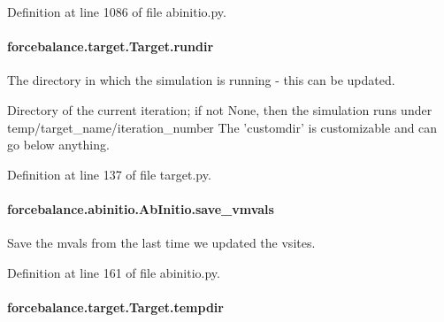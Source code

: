 Definition at line 1086 of file abinitio.\-py.

\hypertarget{classforcebalance_1_1target_1_1Target_a6872de5b2d4273b82336ea5b0da29c9e}{
\paragraph[{rundir}]{\setlength{\rightskip}{0pt plus 5cm}forcebalance.\-target.\-Target.\-rundir\hspace{0.3cm}{\ttfamily [inherited]}}}\label{classforcebalance_1_1target_1_1Target_a6872de5b2d4273b82336ea5b0da29c9e}


The directory in which the simulation is running -\/ this can be updated. 

Directory of the current iteration; if not None, then the simulation runs under temp/target\-\_\-name/iteration\-\_\-number The 'customdir' is customizable and can go below anything.

Definition at line 137 of file target.\-py.

\hypertarget{classforcebalance_1_1abinitio_1_1AbInitio_a22037bf43728fa45f387390005e0b131}{
\paragraph[{save\-\_\-vmvals}]{\setlength{\rightskip}{0pt plus 5cm}forcebalance.\-abinitio.\-Ab\-Initio.\-save\-\_\-vmvals\hspace{0.3cm}{\ttfamily [inherited]}}}\label{classforcebalance_1_1abinitio_1_1AbInitio_a22037bf43728fa45f387390005e0b131}


Save the mvals from the last time we updated the vsites. 



Definition at line 161 of file abinitio.\-py.

\hypertarget{classforcebalance_1_1target_1_1Target_aa1f01b5b78db253b5b66384ed11ed193}{
\paragraph[{tempdir}]{\setlength{\rightskip}{0pt plus 5cm}forcebalance.\-target.\-Target.\-tempdir\hspace{0.3cm}{\ttfamily [inherited]}}}\label{classforcebalance_1_1target_1_1Target_aa1f01b5b78db253b5b66384ed11ed193}


